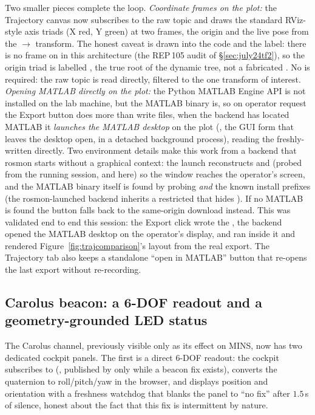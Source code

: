 Two smaller pieces complete the loop. \emph{Coordinate frames on the plot:}
the Trajectory canvas now subscribes to the raw  topic and draws
the standard RViz-style axis triads (X red, Y green) at two frames, the
 origin and the live  pose from the
$\rightarrow$ transform. The honest caveat is
drawn into the code and the label: there is no  frame on 
in this architecture (the REP\,105 audit of \S\ref{sec:july24tf2}), so the
origin triad is labelled , the true root of the dynamic tree, not
a fabricated . No  is required: the
raw topic is read directly, filtered to the one transform of interest.
\emph{Opening MATLAB directly on the plot:} the Python MATLAB Engine API is
not installed on the lab machine, but the MATLAB binary is, so on operator
request the Export button does more than write files, when the backend has
located MATLAB it \emph{launches the MATLAB desktop} on the plot
(, the GUI
 form that leaves the desktop open, in a detached background
process), reading the freshly-written  directly. Two environment
details make this work from a backend that rosmon starts without a graphical
context: the launch reconstructs  and  (probed
from the running session,  and  here) so the window reaches the operator's screen, and the MATLAB
binary itself is found by probing  \emph{and} the known install
prefixes (the rosmon-launched backend inherits a restricted  that
hides ). If no MATLAB is found the button falls back to
the same-origin  download instead. This was validated end to end
this session: the Export click wrote the , the backend opened the
MATLAB desktop on the operator's display, and  ran
inside it and rendered Figure~\ref{fig:trajcomparison}'s layout from the real
export. The Trajectory tab also keeps a standalone ``open in MATLAB'' button
that re-opens the last export without re-recording.

\subsection{Carolus beacon: a 6-DOF readout and a geometry-grounded LED
status}
\label{sec:july27carolus}
The Carolus channel, previously visible only as its effect on MINS, now has
two dedicated cockpit panels. The first is a direct 6-DOF readout: the
cockpit subscribes to 
(, published by
 only while a beacon fix exists), converts
the quaternion to roll/pitch/yaw in the browser, and displays position and
orientation with a freshness watchdog that blanks the panel to ``no fix''
after $1.5$\,s of silence, honest about the fact that this fix is
intermittent by nature.

